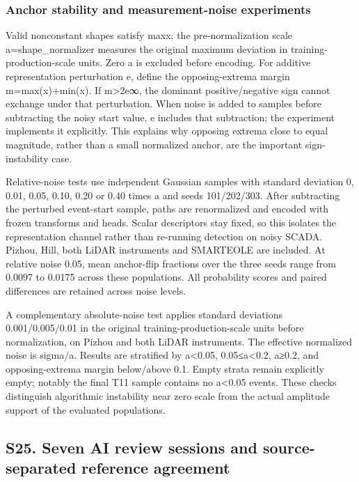 \documentclass[a4paper,11pt]{article}
\begin{document}
\subsubsection{Anchor stability and measurement-noise experiments}\label{anchor-stability-and-measurement-noise-experiments}

Valid nonconstant shapes satisfy max\textbar x; the pre-normalization scale a=shape\_normalizer measures the original maximum deviation in training-production-scale units. Zero a is excluded before encoding. For additive representation perturbation e, define the opposing-extrema margin m=\textbar max(x)+min(x)\textbar. If m\textgreater2\textbar\textbar e\textbar\textbar∞, the dominant positive/negative sign cannot exchange under that perturbation. When noise is added to samples before subtracting the noisy start value, e includes that subtraction; the experiment implements it explicitly. This explains why opposing extrema close to equal magnitude, rather than a small normalized anchor, are the important sign-instability case.

Relative-noise tests use independent Gaussian samples with standard deviation 0, 0.01, 0.05, 0.10, 0.20 or 0.40 times a and seeds 101/202/303. After subtracting the perturbed event-start sample, paths are renormalized and encoded with frozen transforms and heads. Scalar descriptors stay fixed, so this isolates the representation channel rather than re-running detection on noisy SCADA. Pizhou, Hill, both LiDAR instruments and SMARTEOLE are included. At relative noise 0.05, mean anchor-flip fractions over the three seeds range from 0.0097 to 0.0175 across these populations. All probability scores and paired differences are retained across noise levels.

A complementary absolute-noise test applies standard deviations 0.001/0.005/0.01 in the original training-production-scale units before normalization, on Pizhou and both LiDAR instruments. The effective normalized noise is sigma/a. Results are stratified by a\textless0.05, 0.05≤a\textless0.2, a≥0.2, and opposing-extrema margin below/above 0.1. Empty strata remain explicitly empty; notably the final T11 sample contains no a\textless0.05 events. These checks distinguish algorithmic instability near zero scale from the actual amplitude support of the evaluated populations.

\subsection{S25. Seven AI review sessions and source-separated reference agreement}\label{s25.-seven-ai-review-sessions-and-source-separated-reference-agreement}
\end{document}
